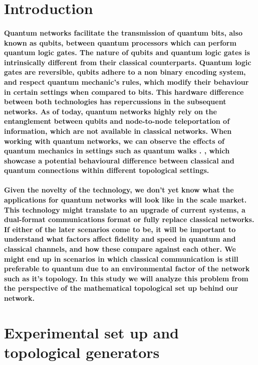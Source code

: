 \documentclass{article}
\begin{document}
\begin{multicols}{2}

    \section{Introduction}

    \paragraph{Quantum networks facilitate the transmission of quantum bits, also known as qubits, between quantum processors which can perform quantum logic gates.
    The nature of qubits and quantum logic gates is intrinsically different from their classical counterparts. Quantum logic gates are reversible, qubits adhere to a non binary encoding system, and respect quantum mechanic's rules, which modify their behaviour in certain settings when compared to bits.
    This hardware difference between both technologies has repercussions in the subsequent networks. As of today, quantum networks highly rely on the entanglement between qubits and node-to-node teleportation of information, which are not available in classical networks.
    When working with quantum networks, we can observe the effects of quantum mechanics in settings such as quantum walks \cite{Quantumwalks}. , which showcase a potential behavioural difference between classical and quantum connections within different topological settings.}


    \paragraph{Given the novelty of the technology, we don't yet know what the applications for quantum networks will look like in the scale market. This technology might translate to an upgrade of current systems, a dual-format communications format or fully replace classical networks. 
    If either of the later scenarios come to be, it will be important to understand what factors affect fidelity and speed in quantum and classical channels, and how these compare against each other. We might end up in scenarios in which classical communication is still preferable to quantum due to an environmental factor of the network such as it's topology.
    In this study we will analyze this problem from the perspective of the mathematical topological set up behind our network.}


    \section{Experimental set up and topological generators}


\end{multicols}
\end{document}
